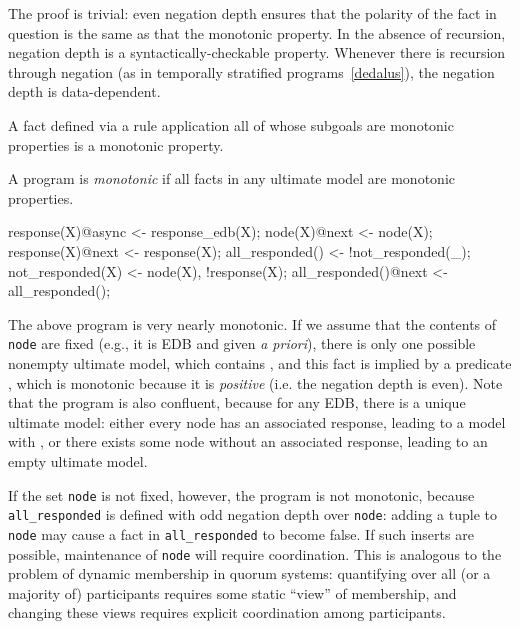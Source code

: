 The proof is trivial: even negation depth ensures that the polarity of the fact in question is the
same as that the monotonic property.  In the absence of recursion, negation depth is a syntactically-checkable property.  Whenever there is recursion through negation
(as in temporally stratified \lang programs~\ref{dedalus}), the negation depth is data-dependent.

\begin{definition}
A fact defined via a rule application all of whose subgoals are monotonic properties is a
monotonic property.
\end{definition}

\begin{definition}
A \lang program is {\em monotonic} if all facts in any ultimate model are monotonic properties.
\end{definition}

\begin{example}
\begin{Dedalus}
response(X)@async <- response_edb(X);
node(X)@next <- node(X);
response(X)@next <- response(X);
all_responded() <- !not_responded(_);
not_responded(X) <- node(X), !response(X);
all_responded()@next <- all_responded();
\end{Dedalus}
\end{example}

The above program is very nearly monotonic. If we assume that the contents of \texttt{node}
are fixed (e.g., it is EDB and given \emph{a priori}), there is only one possible nonempty ultimate model, which contains , and this fact is implied by a predicate , which is monotonic because it is {\em positive} (i.e. the negation depth is even). 
Note that the program is also confluent, because for any EDB, there is a unique ultimate model: either every node has an associated response, leading to a model with , or there exists some node without an associated response, leading to an empty ultimate model.

If the set \texttt{node} is not fixed, however, the program is not monotonic, because 
\texttt{all\_responded} is defined with odd negation depth over \texttt{node}: adding a tuple
to \texttt{node} may cause a fact in \texttt{all\_responded} to become false.  If such inserts
are possible, maintenance of \texttt{node} will require coordination.  This is analogous to
the problem of dynamic membership in quorum systems: quantifying over all (or a majority
of) participants requires some static ``view'' of membership, and changing these views requires
explicit coordination among participants.

